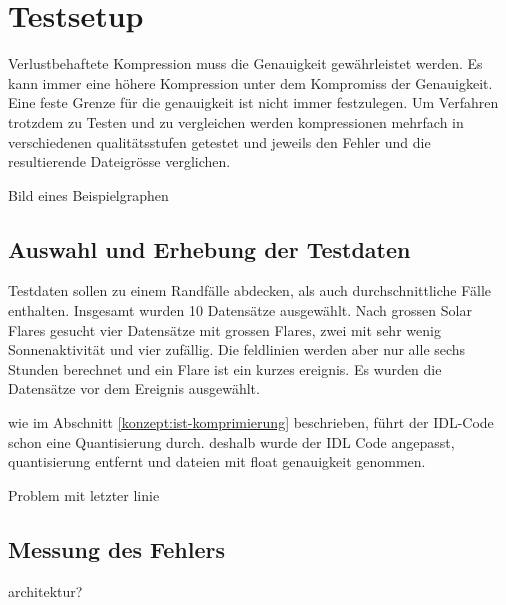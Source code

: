 \section{Testsetup}
Verlustbehaftete Kompression muss die Genauigkeit gewährleistet werden.
Es kann immer eine höhere Kompression unter dem Kompromiss der Genauigkeit.
Eine feste Grenze für die genauigkeit ist nicht immer festzulegen.
Um Verfahren trotzdem zu Testen und zu vergleichen werden kompressionen mehrfach in verschiedenen qualitätsstufen getestet und jeweils den Fehler und die resultierende Dateigrösse verglichen.

Bild eines Beispielgraphen

\subsection{Auswahl und Erhebung der Testdaten}
Testdaten sollen zu einem Randfälle abdecken, als auch durchschnittliche Fälle enthalten.
Insgesamt wurden 10 Datensätze ausgewählt. Nach grossen Solar Flares gesucht vier Datensätze mit grossen Flares, zwei mit sehr wenig Sonnenaktivität und vier zufällig.
Die feldlinien werden aber nur alle sechs Stunden berechnet und ein Flare ist ein kurzes ereignis. Es wurden die Datensätze vor dem Ereignis ausgewählt.

wie im Abschnitt \ref{konzept:ist-komprimierung} beschrieben, führt der IDL-Code schon eine Quantisierung durch. deshalb wurde der IDL Code angepasst, quantisierung entfernt und dateien mit float genauigkeit genommen.  

Problem mit letzter linie

\subsection{Messung des Fehlers}

architektur?

